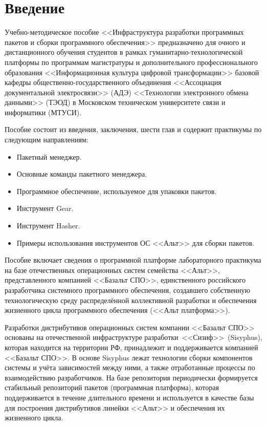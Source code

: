 \chapter*{Введение}

Учебно-методическое пособие <<Инфраструктура разработки программных пакетов и сборки 
программного обеспечения>> предназначено для очного и дистанционного обучения студентов 
в рамках гуманитарно-технологической платформы по программам магистратуры и 
дополнительного профессионального образования <<Информационная культура цифровой 
трансформации>> базовой кафедры общественно-государственного объединения <<Ассоциация 
документальной электросвязи>> (АДЭ) <<Технологии электронного обмена данными>> (ТЭОД) 
в Московском техническом университете связи и информатики (МТУСИ). 

Пособие состоит из введения, заключения, шести глав и содержит практикумы по следующим направлениям:
\begin{itemize}
	\item Пакетный менеджер.
	\item Основные команды пакетного менеджера.
	\item Программное обеспечение, используемое для упаковки пакетов.
	\item Инструмент Gear.
	\item Инструмент Hasher.
	\item Примеры использования инструментов ОС <<Альт>> для сборки пакетов.
\end{itemize}

Пособие включает сведения о программной платформе лабораторного практикума на базе 
отечественных операционных систем семейства <<Альт>>, представленного компанией <<Базальт СПО>>, 
единственного российского разработчика системного программного обеспечения, создавшего 
собственную технологическую среду распределённой коллективной разработки и обеспечения 
жизненного цикла программного обеспечения (<<Альт платформа>>).

Разработки дистрибутивов операционных систем компании <<Базальт СПО>> основаны на 
отечественной инфраструктуре разработки <<Сизиф>> (Sisyphus), которая находится на 
территории РФ, принадлежит и поддерживается компанией <<Базальт СПО>>. В основе 
Sisyphus лежат технологии сборки компонентов системы и учёта зависимостей между ними, а
также отработанные процессы по взаимодействию разработчиков. На базе репозитория
периодически формируется стабильный репозиторий пакетов (программная платформа), которая поддерживается
в течение длительного времени и используется в качестве базы для построения дистрибутивов 
линейки <<Альт>> и обеспечения их жизненного цикла.

